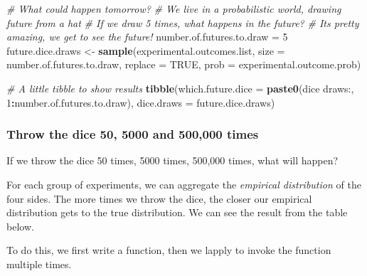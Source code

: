 \documentclass[
]{book}
\newenvironment{Shaded}{\begin{snugshade}}{\end{snugshade}}
\newcommand{\CommentTok}[1]{\textcolor[rgb]{0.56,0.35,0.01}{\textit{#1}}}
\newcommand{\DataTypeTok}[1]{\textcolor[rgb]{0.13,0.29,0.53}{#1}}
\newcommand{\DecValTok}[1]{\textcolor[rgb]{0.00,0.00,0.81}{#1}}
\newcommand{\KeywordTok}[1]{\textcolor[rgb]{0.13,0.29,0.53}{\textbf{#1}}}
\newcommand{\NormalTok}[1]{#1}
\newcommand{\OperatorTok}[1]{\textcolor[rgb]{0.81,0.36,0.00}{\textbf{#1}}}
\newcommand{\OtherTok}[1]{\textcolor[rgb]{0.56,0.35,0.01}{#1}}
\newcommand{\StringTok}[1]{\textcolor[rgb]{0.31,0.60,0.02}{#1}}
\begin{document}
\begin{Shaded}
\begin{Highlighting}[]
\CommentTok{\# What could happen tomorrow?}
\CommentTok{\# We live in a probabilistic world, drawing future from a hat}
\CommentTok{\# If we draw 5 times, what happens in the future?}
\CommentTok{\# It\textquotesingle{}s pretty amazing, we get to see the future!}
\NormalTok{number.of.futures.to.draw =}\StringTok{ }\DecValTok{5}
\NormalTok{future.dice.draws \textless{}{-}}\StringTok{ }\KeywordTok{sample}\NormalTok{(experimental.outcomes.list,}
                                 \DataTypeTok{size =}\NormalTok{ number.of.futures.to.draw,}
                                 \DataTypeTok{replace =} \OtherTok{TRUE}\NormalTok{,}
                                 \DataTypeTok{prob =}\NormalTok{ experimental.outcome.prob)}

\CommentTok{\# A little tibble to show results}
\KeywordTok{tibble}\NormalTok{(}\DataTypeTok{which.future.dice =} \KeywordTok{paste0}\NormalTok{(}\StringTok{\textquotesingle{}dice draws:\textquotesingle{}}\NormalTok{, }\DecValTok{1}\OperatorTok{:}\NormalTok{number.of.futures.to.draw),}
       \DataTypeTok{dice.draws =}\NormalTok{ future.dice.draws)}
\end{Highlighting}
\end{Shaded}

\hypertarget{throw-the-dice-50-5000-and-500000-times}{%
\subsubsection{Throw the dice 50, 5000 and 500,000 times}\label{throw-the-dice-50-5000-and-500000-times}}

If we throw the dice 50 times, 5000 times, 500,000 times, what will happen?

For each group of experiments, we can aggregate the \emph{empirical distribution} of the four sides. The more times we throw the dice, the closer our empirical distribution gets to the true distribution. We can see the result from the table below.

To do this, we first write a function, then we lapply to invoke the function multiple times.
\end{document}

